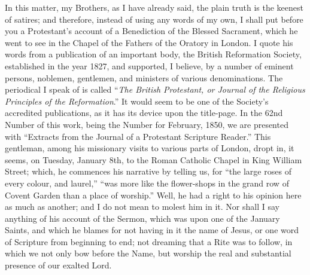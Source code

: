 In this matter, my Brothers, as I have already said,
the plain truth is the keenest of satires; and therefore,
instead of using any words of my own, I shall put before
you a Protestant's account of a Benediction of the
Blessed Sacrament, which he went to see in the Chapel of
the Fathers of the Oratory in London. I quote his words
from a publication of an important body, the British
Reformation Society, established in the year 1827, and
supported, I believe, by a number of eminent persons,
noblemen, gentlemen, and ministers of various
denominations. The periodical I speak of is called ``\emph{The
British Protestant, or Journal of the Religious
Principles of the Reformation}.'' It would seem
to be one of the Society's accredited publications, as it
has its device upon the title-page. In the 62nd Number of
this work, being the Number for February, 1850, we are
presented with ``Extracts from the Journal of a
Protestant Scripture Reader.'' This gentleman, among
his missionary visits to various parts of London, dropt
in, it seems, on Tuesday, January 8th, to the Roman
Catholic Chapel in King William Street; which, he
commences his narrative by telling us, for ``the
large roses of every colour, and laurel,'' ``was
more like the flower-shops in the grand row of Covent
Garden than a place of worship.'' Well, he had a
right to his opinion here as much as another; and I do
not mean to molest him in it. Nor shall I say anything of
his account of the Sermon, which was upon one of the
January Saints, and which he blames for not having in it
the name of Jesus, or one word of Scripture from
beginning to end; not dreaming that a Rite was to follow,
in which we not only bow before the Name, but worship the
real and substantial presence of our exalted Lord.

